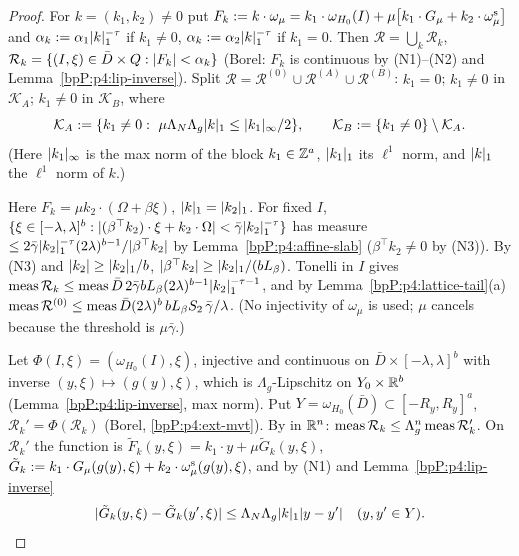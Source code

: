 \begin{proof}
For $k=(k_1,k_2)\ne0$ put $F_k:=k\cdot\omega_\mu=k_1\cdot\omega_{H_0}(I)+\mu\bigl[k_1\cdot G_\mu+k_2\cdot\omega^{\rm s}_\mu\bigr]$ and $\alpha_k:=\alpha_1\lvert k\rvert_1^{-\tau}$ if $k_1\ne0$, $\alpha_k:=\alpha_2\lvert k\rvert_1^{-\tau}$ if $k_1=0$. Then $\mathcal R=\bigcup_k\mathcal R_k$, $\mathcal R_k=\{(I,\xi)\in\bar D\times Q:\lvert F_k\rvert<\alpha_k\}$ (Borel: $F_k$ is continuous by (N1)--(N2) and Lemma~\ref{bpP:p4:lip-inverse}). Split $\mathcal R=\mathcal R^{(0)}\cup\mathcal R^{(A)}\cup\mathcal R^{(B)}$: $k_1=0$; $k_1\ne0$ in $\mathcal K_A$; $k_1\ne0$ in $\mathcal K_B$, where
\[\mathcal K_A:=\{k_1\ne0:\ \mu\Lambda_N\Lambda_g\abs{k}_1\le\abs{k_1}_\infty/2\},\qquad\mathcal K_B:=\{k_1\ne0\}\setminus\mathcal K_A.\]
(Here $\lvert k_1\rvert_\infty$ is the max norm of the block $k_1\in\mathbb{Z}^a$, $\lvert k_1\rvert_1$ its $\ell^1$ norm, and $\lvert k\rvert_1$ the $\ell^1$ norm of $k$.)

\label{stepP:p4:dm-slow}
Here $F_k=\mu k_2\cdot(\Omega+\beta\xi)$, $\lvert k\rvert_1=\lvert k_2\rvert_1$. For fixed $I$, $\{\xi\in[-\lambda,\lambda]^b:\lvert (\beta^\top k_2)\cdot\xi+k_2\cdot\Omega\rvert<\bar\gamma\lvert k_2\rvert_1^{-\tau}\}$ has measure $\le2\bar\gamma\lvert k_2\rvert_1^{-\tau}(2\lambda)^{b-1}/\lvert \beta^\top k_2\rvert$ by Lemma~\ref{bpP:p4:affine-slab} ($\beta^\top k_2\ne0$ by (N3)). By (N3) and $\lvert k_2\rvert\ge\lvert k_2\rvert_1/b$, $\lvert \beta^\top k_2\rvert\ge\lvert k_2\rvert_1/(bL_\beta)$. Tonelli in $I$ gives $\operatorname{meas}\mathcal R_k\le\operatorname{meas}\bar D\,2\bar\gamma bL_\beta(2\lambda)^{b-1}\lvert k_2\rvert_1^{-\tau-1}$, and by Lemma~\ref{bpP:p4:lattice-tail}(a) $\operatorname{meas}\mathcal R^{(0)}\le\operatorname{meas}\bar D(2\lambda)^b\,bL_\beta S_2\,\bar\gamma/\lambda$. (No injectivity of $\omega_\mu$ is used; $\mu$ cancels because the threshold is $\mu\bar\gamma$.)

\label{stepP:p4:dm-y}
Let $\Phi(I,\xi)=(\omega_{H_0}(I),\xi)$, injective and continuous on $\bar D\times[-\lambda,\lambda]^b$ with inverse $(y,\xi)\mapsto(g(y),\xi)$, which is $\Lambda_g$-Lipschitz on $Y_0\times\mathbb{R}^b$ (Lemma~\ref{bpP:p4:lip-inverse}, max norm). Put $Y=\omega_{H_0}(\bar D)\subset[-R_y,R_y]^a$, $\mathcal R_k'=\Phi(\mathcal R_k)$ (Borel, \ref{bpP:p4:ext-mvt}). By  in $\mathbb{R}^n$: $\operatorname{meas}\mathcal R_k\le\Lambda_g^n\operatorname{meas}\mathcal R_k'$. On $\mathcal R_k'$ the function is $\tilde F_k(y,\xi)=k_1\cdot y+\mu\tilde G_k(y,\xi)$, $\tilde G_k:=k_1\cdot G_\mu(g(y),\xi)+k_2\cdot\omega^{\rm s}_\mu(g(y),\xi)$, and by (N1) and Lemma~\ref{bpP:p4:lip-inverse}
\[\lvert \tilde G_k(y,\xi)-\tilde G_k(y',\xi)\rvert\le\Lambda_N\Lambda_g\lvert k\rvert_1\lvert y-y'\rvert\quad(y,y'\in Y).\]


\end{proof}
